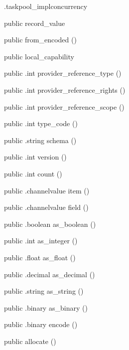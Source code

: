 \begin{CrexxClass}{.taskpool\_impl}{concurrency}
\begin{Members}
    \Factory
      {public}
      {record\_value}
      {}

    \Factory
      {public}
      {from\_encoded}
      {()}

    \Factory
      {public}
      {local\_capability}
      {}

    \Method
      {public}
      {.int}
      {provider\_reference\_type}
      {()}

    \Method
      {public}
      {.int}
      {provider\_reference\_rights}
      {()}

    \Method
      {public}
      {.int}
      {provider\_reference\_scope}
      {()}

    \Method
      {public}
      {.int}
      {type\_code}
      {()}

    \Method
      {public}
      {.string}
      {schema}
      {()}

    \Method
      {public}
      {.int}
      {version}
      {()}

    \Method
      {public}
      {.int}
      {count}
      {()}

    \Method
      {public}
      {.channelvalue}
      {item}
      {()}

    \Method
      {public}
      {.channelvalue}
      {field}
      {()}

    \Method
      {public}
      {.boolean}
      {as\_boolean}
      {()}

    \Method
      {public}
      {.int}
      {as\_integer}
      {()}

    \Method
      {public}
      {.float}
      {as\_float}
      {()}

    \Method
      {public}
      {.decimal}
      {as\_decimal}
      {()}

    \Method
      {public}
      {.string}
      {as\_string}
      {()}

    \Method
      {public}
      {.binary}
      {as\_binary}
      {()}

    \Method
      {public}
      {.binary}
      {encode}
      {()}

    \Factory
      {public}
      {allocate}
      {()}


\end{Members}
\end{CrexxClass}
